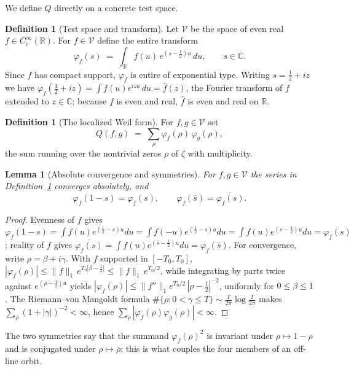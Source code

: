 \documentclass[11pt]{amsart}
\newtheorem{lemma}[theorem]{Lemma}
\theoremstyle{definition}
\newtheorem{definition}[theorem]{Definition}
\theoremstyle{remark}
\newcommand{\half}{\tfrac12}
\newcommand{\fhat}{\widehat f}
\begin{document}
We define $Q$ directly on a concrete test space.

\begin{definition}[Test space and transform]\label{def:setup}
Let $\mathcal V$ be the space of even real $f\in C_c^\infty(\mathbb R)$. For $f\in\mathcal V$
define the entire transform
\[
\varphi_f(s)\;=\;\int_{\mathbb R} f(u)\,e^{(s-\frac12)u}\,du,\qquad s\in\mathbb C .
\]
Since $f$ has compact support, $\varphi_f$ is entire of exponential type. Writing
$s=\half+iz$ we have $\varphi_f(\half+iz)=\int f(u)e^{izu}\,du=\fhat(z)$, the Fourier
transform of $f$ extended to $z\in\mathbb C$; because $f$ is even and real, $\fhat$ is even
and real on $\mathbb R$.
\end{definition}

\begin{definition}[The localized Weil form]\label{def:weil}
For $f,g\in\mathcal V$ set
\[
Q(f,g)\;=\;\sum_{\rho}\varphi_f(\rho)\,\varphi_g(\rho),
\]
the sum running over the nontrivial zeros $\rho$ of $\zeta$ with multiplicity.
\end{definition}

\begin{lemma}[Absolute convergence and symmetries]\label{lem:conv}
For $f,g\in\mathcal V$ the series in Definition~\ref{def:weil} converges absolutely, and
\[
\varphi_f(1-s)=\varphi_f(s),\qquad \varphi_f(\bar s)=\overline{\varphi_f(s)} .
\]
\end{lemma}
\begin{proof}
Evenness of $f$ gives $\varphi_f(1-s)=\int f(u)e^{(\frac12-s)u}du=\int f(-u)e^{(\frac12-s)u}
du=\int f(u)e^{(s-\frac12)u}du=\varphi_f(s)$; reality of $f$ gives
$\overline{\varphi_f(s)}=\int f(u)e^{(\bar s-\frac12)u}du=\varphi_f(\bar s)$. For
convergence, write $\rho=\beta+i\gamma$. With $f$ supported in $[-T_0,T_0]$,
$|\varphi_f(\rho)|\le\|f\|_1\,e^{T_0|\beta-\frac12|}\le\|f\|_1\,e^{T_0/2}$, while integrating by
parts twice against $e^{(\rho-\frac12)u}$ yields $|\varphi_f(\rho)|\le
\|f''\|_1e^{T_0/2}\,|\rho-\half|^{-2}$, uniformly for $0\le\beta\le1$. The Riemann--von
Mangoldt formula $\#\{\rho:0<\gamma\le T\}\sim\frac{T}{2\pi}\log\frac{T}{2\pi}$ makes
$\sum_\rho(1+|\gamma|)^{-2}<\infty$, hence $\sum_\rho|\varphi_f(\rho)\varphi_g(\rho)|<\infty$.
\end{proof}

The two symmetries say that the summand $\varphi_f(\rho)^2$ is invariant under
$\rho\mapsto1-\rho$ and is conjugated under $\rho\mapsto\bar\rho$; this is what couples the
four members of an off-line orbit.
\end{document}

